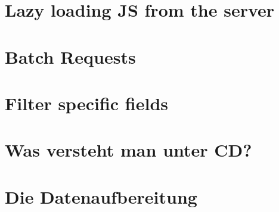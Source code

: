 \section{Lazy loading JS from the server}


\section{Batch Requests}

\section{Filter specific fields}

\section{Was versteht man unter CD?}
\label{sec:was-versteht-man-unter-cd}

\section{Die Datenaufbereitung}

